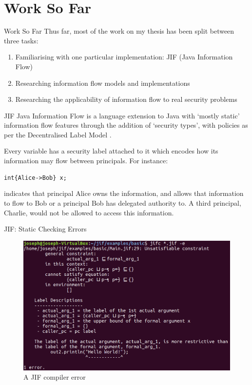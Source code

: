 \section{Work So Far}

\begin{frame}{Work So Far}
	Thus far, most of the work on my thesis has been split between three tasks:
	
	\begin{enumerate}
		\item Familiarising with one particular implementation: JIF (Java Information Flow)
		\item Researching information flow models and implementations
		\item Researching the applicability of information flow to real security problems
	\end{enumerate}
\end{frame}

\begin{frame}{JIF}
	Java Information Flow is a language extension to Java with `mostly static' information flow features through the addition of `security types', with policies as per the Decentralised Label Model \cite{work:myersdlm}.
	
	Every variable has a security label attached to it which encodes how its information may flow between principals. For instance:
	
	\texttt{int\{Alice->Bob\} x;}
	
	indicates that principal Alice owns the information, and allows that information to flow to Bob or a principal Bob has delegated authority to. A third principal, Charlie, would not be allowed to access this information.
\end{frame}

\begin{frame}{JIF: Static Checking Errors}
	\begin{figure}
		\includegraphics[scale=0.5]{content/images/jif_helloworld_error.png}
		\caption{A JIF compiler error}
	\end{figure}
\end{frame}

